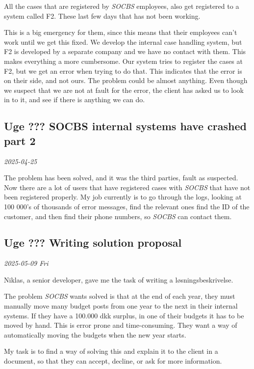 \documentclass[../main.tex]{subfiles}
\begin{document}
All the cases that are registered by \textit{SOCBS} employees, also get registered to a system called F2. These last few days that has not been working. 

This is a big emergency for them, since this means that their employees can't work until we get this fixed.
We develop the internal case handling system, but F2 is developed by a separate company and we have no contact with them.
This makes everything a more cumbersome. Our system tries to register the cases at F2, but we get an error when trying to do that. 
This indicates that the error is on their side, and not ours. The problem could be almost anything.
Even though we suspect that we are not at fault for the error, the client has asked us to look in to it, and see if there is anything we can do.

\subsection{Uge ??? \textbf{SOCBS internal systems have crashed part 2}}

\textit{2025-04-25}

The problem has been solved, and it was the third parties, fault as suspected. Now there are a lot of users that have registered cases with \textit{SOCBS} that have not been registered properly. 
My job currently is to go through the logs, looking at 100 000's of thousands of error messages, find the relevant ones find the ID of the customer, and then find their phone numbers, so \textit{SOCBS} can contact them.

\subsection{Uge ??? \textbf{Writing solution proposal}}

\textit{2025-05-09 Fri}

Niklas, a senior developer, gave me the task of writing a løsningsbeskrivelse.

The problem \textit{SOCBS} wants solved is that at the end of each year, they must manually move many budget posts from one year to the next in their internal systems. If they have a 100.000 dkk surplus, in one of their budgets it has to be moved by hand.
This is error prone and time-consuming. They want a way of automatically moving the budgets when the new year starts.

My task is to find a way of solving this and explain it to the client in a document, so that they can accept, decline, or ask for more information.
\end{document}
